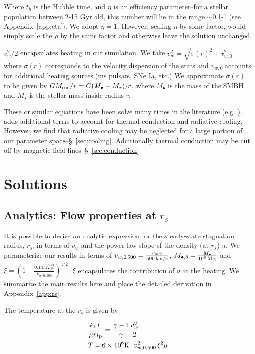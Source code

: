 \documentclass[usenatbib,fleqn]{mn2e}
\newcommand{\rs}{r_s}
\newcommand{\vw}{v_w}
\newcommand{\kew}{\frac{v_w^2}{2}}
\newcommand{\gammafi}{\frac{\gamma-1}{\gamma}}
\newcommand{\kb}{k_{\rm b}}
\renewcommand{\mp}{m_{\rm p}}
\newcommand{\Menc}{M_{\rm enc}}
\newcommand{\Mstar}{M_{\star}}
\newcommand{\Mbh}[1][]{M_{\bullet#1}}
\newcommand{\Mbheight}{M_{\bullet,8}}
\newcommand{\MbheightExp}{\frac{\Mbh}{10^8 \Msun}}
\newcommand{\vwO}{v_{w,0}}
\newcommand{\vwOFH}{v_{w,0,500}}
\newcommand{\vwOFHexp}{\frac{\vwO}{500 \, {\rm km/s}}}
\begin{document}
Where $t_h$ is the Hubble time, and $\eta$ is an efficiency parameter--for a stellar population between 2-15 Gyr old, this number will lie in the range $\sim$0.1-1 (see Appendix~\ref{app:eta}). We adopt $\eta=1$. However, scaling $\eta$ by some factor, would simply scale the $\rho$ by the same factor and otherwise leave the solution unchanged. 

$\vw^2/2$ encapsulates heating in our simulation. We take $\vw^2=\sqrt{\sigma(r)^2+v_{w,0}^2}$ where $\sigma(r)$ corresponds to the velocity dispersion of the stars and $v_{w,0}$ accounts for additional heating sources (ms pulsars, SNe Ia, etc.)  We approximate $\sigma(r)$ to be given by $G \Menc/r=G(\Mbh+\Mstar)/r$, where $\Mbh$ is the mass of the SMBH and $\Mstar$ is the stellar mass inside radius $r$. 

These or similar equations have been solve many times in the
literature (e.g. \citealt{HolzerAxford:1970a,Quataert:2004a,De-ColleGuillochon+:2012a,ShcherbakovWong+:2014a}). \citealt{ShcherbakovWong+:2014a}
adds additional terms to account for thermal conduction and radiative
cooling. However, we find that radiative cooling may be neglected for
a large portion of our parameter space--\S~\ref{sec:cooling}.
Additionally thermal conduction may be cut off by magnetic field
lines--\S~\ref{sec:conduction}


\section{Solutions}
\subsection{Analytics: Flow properties at $\rs$}
It is possible to derive an analytic expression for the steady-state
stagnation radius, $\rs$, in terms of $v_w$ and the power law slope of
the density (at $\rs$) $n$.  We parameterize our results in terms of
$\vwOFH=\vwOFHexp$, $\Mbheight=\MbheightExp$ and
$\xi=\left(1+\frac{0.14 \Mbheight^{0.43}}{\vwOFH}\right)^{1/2}$. $\xi$
encapsulates the contribution of $\sigma$ in the heating.  We
summarize the main results here and place the detailed derivation in
Appendix~\ref{app:rs}.


The temperature at the $\rs$ is given by

\begin{align}
  &\frac{\kb T}{\mu \mp}=\gammafi \kew \label{eq:tstag}\\
  &T=6 \times 10^6 {\rm K} \,  \,\ \vwOFH^2 \, \xi^2 \mu
\end{align}
\end{document}

